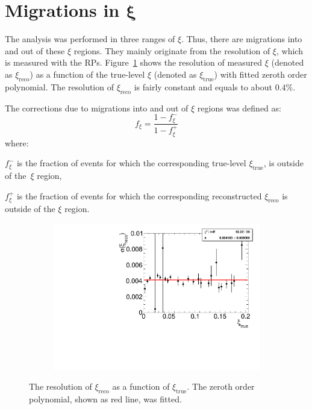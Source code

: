 \section[Migrations of $\xi$]{Migrations in $\mathbf{\xi}$}\label{section:star_xi}
The analysis was performed in three ranges of $\xi$. Thus, there are
migrations into and out of these $\xi$ regions. They mainly originate from the resolution of $\xi$, which is measured with the RPs. Figure~\ref{fig:xi_correction_resolution} shows the resolution of measured $\xi$ (denoted as $\xi_\textrm{reco}$) as a function of the true-level $\xi$ (denoted as $\xi_\textrm{true}$) with fitted zeroth order polynomial. The resolution of $\xi_\textrm{reco}$ is fairly constant and equals to about $0.4\%$.

The corrections due to migrations into and out of  $\xi$ regions was defined as:
 \begin{equation}
 f_{\xi} = \frac{1-f_{\xi}^-}{1-f_{\xi}^+}
 \end{equation}
 where:
 \begin{description}
 	\item $f_{\xi}^-$ is the fraction of events for which the corresponding true-level $\xi_\textrm{true}$, is outside of the~$\xi$ region,
 	\item $f_{\xi}^+$  is the fraction of events for which the corresponding reconstructed $\xi_\textrm{reco}$ is outside of the $\xi$ region.
 \end{description}
 \begin{figure}[h!]
 	\centering
 	\begin{subfigure}{.49\textwidth}
 		\includegraphics[width=\textwidth,page=1]{chapters/chrgSTAR/img/xiMigration/RPresolution.pdf}
 	\end{subfigure}
 	\begin{minipage}{.49\textwidth}
 		\caption{The resolution of $\xi_\textrm{reco}$ as a function of $\xi_\textrm{true}$. The zeroth order polynomial, shown as red line, was fitted.}
 		\label{fig:xi_correction_resolution}
 	\end{minipage}
 \end{figure}
